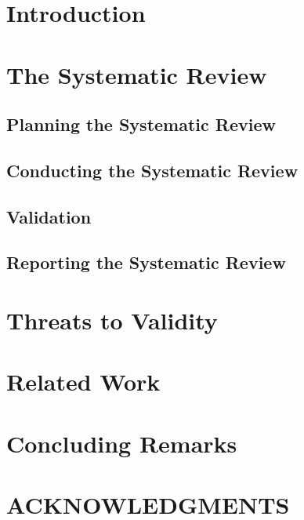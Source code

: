 \documentclass{sig-alternate}
\begin{document}


\section{Introduction}
	
	

\section{The Systematic Review}\label{method}
	
	\subsection{Planning the Systematic Review\label{planning}}
		
	\subsection{Conducting the Systematic Review\label{conducting}}
		
	\subsection{Validation\label{validation}}
			
	\subsection{Reporting the Systematic Review\label{reporting}}
		
	
\section{Threats to Validity}\label{threats}
		
		
\section{Related Work}\label{related}
	
			
\section{Concluding Remarks}\label{conclusion}
		

\section{ACKNOWLEDGMENTS}\label{ack}
	      
	
		

\end{document}
